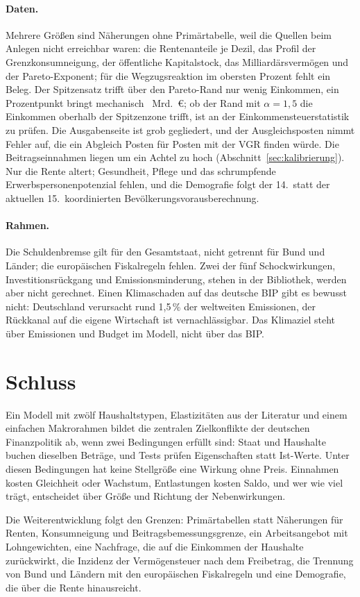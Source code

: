 \paragraph{Daten.} Mehrere Größen sind Näherungen ohne Primärtabelle, weil die
Quellen beim Anlegen nicht erreichbar waren: die Rentenanteile je Dezil, das
Profil der Grenzkonsumneigung, der öffentliche Kapitalstock, das
Milliardärsvermögen und der Pareto-Exponent; für die Wegzugsreaktion im
obersten Prozent fehlt ein Beleg. Der Spitzensatz trifft über den Pareto-Rand
nur wenig Einkommen, ein Prozentpunkt bringt mechanisch
~Mrd.~\euro; ob der Rand mit $\alpha = 1{,}5$ die
Einkommen oberhalb der Spitzenzone trifft, ist an der Einkommensteuerstatistik
zu prüfen. Die Ausgabenseite ist grob gegliedert, und
der Ausgleichsposten nimmt Fehler auf, die ein Abgleich Posten für Posten mit
der VGR finden würde. Die Beitragseinnahmen liegen um ein Achtel zu hoch
(Abschnitt~\ref{sec:kalibrierung}). Nur die Rente altert; Gesundheit, Pflege
und das schrumpfende Erwerbspersonenpotenzial fehlen, und die Demografie folgt
der 14.~statt der aktuellen 15.~koordinierten Bevölkerungsvorausberechnung.

\paragraph{Rahmen.} Die Schuldenbremse gilt für den Gesamtstaat, nicht
getrennt für Bund und Länder; die europäischen Fiskalregeln fehlen. Zwei der
fünf Schockwirkungen, Investitionsrückgang und Emissionsminderung, stehen in
der Bibliothek, werden aber nicht gerechnet. Einen Klimaschaden auf das
deutsche BIP gibt es bewusst nicht: Deutschland verursacht rund 1,5\,\% der
weltweiten Emissionen, der Rückkanal auf die eigene Wirtschaft ist
vernachlässigbar. Das Klimaziel steht über Emissionen und Budget im Modell,
nicht über das BIP.

\section{Schluss}
\label{sec:schluss}

Ein Modell mit zwölf Haushaltstypen, Elastizitäten aus der Literatur und einem
einfachen Makrorahmen bildet die zentralen Zielkonflikte der deutschen
Finanzpolitik ab, wenn zwei Bedingungen erfüllt sind: Staat und Haushalte
buchen dieselben Beträge, und Tests prüfen Eigenschaften statt Ist-Werte. Unter
diesen Bedingungen hat keine Stellgröße eine Wirkung ohne Preis. Einnahmen
kosten Gleichheit oder Wachstum, Entlastungen kosten Saldo, und wer wie viel
trägt, entscheidet über Größe und Richtung der Nebenwirkungen.

Die Weiterentwicklung folgt den Grenzen: Primärtabellen statt Näherungen für
Renten, Konsumneigung und Beitragsbemessungsgrenze, ein Arbeitsangebot mit
Lohngewichten, eine Nachfrage, die auf die Einkommen der Haushalte zurückwirkt,
die Inzidenz der Vermögensteuer nach dem Freibetrag, die Trennung von Bund und
Ländern mit den europäischen Fiskalregeln und eine Demografie, die über die
Rente hinausreicht.
